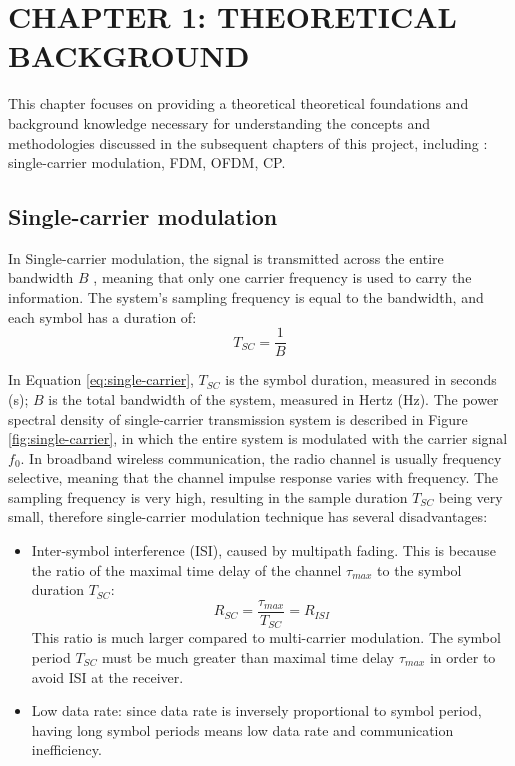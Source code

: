 \section*{CHAPTER 1: THEORETICAL BACKGROUND}
\setcounter{section}{1}
\setcounter{subsection}{0}
\setcounter{figure}{0}
\setcounter{table}{0}

This chapter focuses on providing a theoretical theoretical foundations and background knowledge necessary for understanding the concepts and methodologies discussed in the subsequent chapters of this project, including : single-carrier modulation, FDM, OFDM, CP. 

\subsection{Single-carrier modulation}
In Single-carrier modulation, the signal is transmitted across the entire bandwidth $B$ \cite{OFDM2006}, meaning that only one carrier frequency is used to carry the information. The system's sampling frequency is equal to the bandwidth, and each symbol has a duration of:
\begin{equation}
    T_{SC} = \frac{1}{B}
    \label{eq:single-carrier}
\end{equation}

In Equation \ref{eq:single-carrier}, $T_{SC}$ is the symbol duration, measured in seconds (s); $B$ is the total bandwidth of the system, measured in Hertz (Hz). The power spectral density of single-carrier transmission system is described in Figure \ref{fig:single-carrier}, in which the entire system is modulated with the carrier signal $f_0$. In broadband wireless communication, the radio channel is usually frequency selective, meaning that the channel impulse response varies with frequency. The sampling frequency is very high, resulting in the sample duration $T_{SC}$ being very small, therefore single-carrier modulation technique has several disadvantages:

\begin{itemize}
    \item Inter-symbol interference (ISI), caused by multipath fading. This is because the ratio of the maximal time delay of the channel $\tau_{max}$ to the symbol duration $T_{SC}$:
    \begin{equation}
        R_{SC} = \frac{\tau_{max}}{T_{SC}} = R_{ISI}
    \end{equation}
    This ratio is much larger compared to multi-carrier modulation. The symbol period $T_{SC}$ must be much greater than maximal time delay $\tau_{max}$ in order to avoid ISI at the receiver.
    \item Low data rate: since data rate is inversely proportional to symbol period, having long symbol periods means low data rate and communication inefficiency.
\end{itemize}

